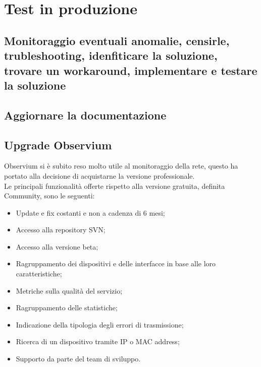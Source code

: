 \documentclass[Realizzazione.tex]{subfiles}
\begin{document}
\section{Test in produzione}
\subsection{Monitoraggio eventuali anomalie, censirle, trubleshooting, idenfiticare la soluzione, trovare un workaround, implementare e testare la soluzione}
\subsection{Aggiornare la documentazione}
\subsection{Upgrade Observium}
Observium si è subito reso molto utile al monitoraggio della rete, questo ha portato alla decisione di acquistarne la versione professionale. \\
Le principali funzionalità offerte rispetto alla versione gratuita, definita Community, sono le seguenti:
\begin{itemize}
	\item Update e fix costanti e non a cadenza di 6 mesi;
	\item Accesso alla repository SVN;
	\item Accesso alla versione beta;
	\item Ragruppamento dei dispositivi e delle interfacce in base alle loro caratteristiche;
	\item Metriche sulla qualità del servizio;
	\item Ragruppamento delle statistiche;
	\item Indicazione della tipologia degli errori di trasmissione;
	\item Ricerca di un dispositivo tramite IP o MAC address;
	\item Supporto da parte del team di sviluppo.
\end{itemize}
\end{document}
